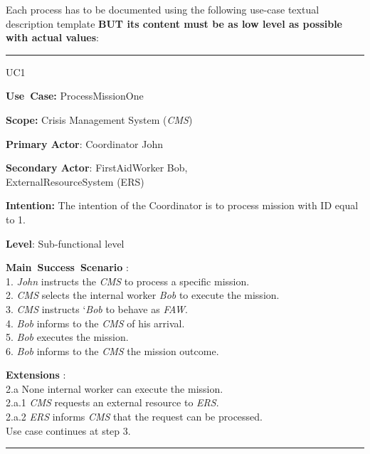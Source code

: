 Each process has to be documented using the following use-case textual description
template \cite{armour01usecase} \textbf{BUT its content must be as low level as possible with actual values}:
\vspace{0.5cm}
\hrule
\begin{lyxlist}{UC1}
\small{
\item [\textbf{Use~Case:}] ProcessMissionOne
\item [\textbf{Scope:}] Crisis Management System (\emph{CMS})
\item [\textbf{Primary Actor}:] Coordinator John
\item [\textbf{Secondary Actor}:] FirstAidWorker Bob,\\
                  ExternalResourceSystem (ERS)
\item [\textbf{Intention:}]The intention of the Coordinator is to process mission with ID equal to 1.
\item [\textbf{Level}:]Sub-functional level
\item [\textbf{Main~Success~Scenario}]:\\
1. \emph{John} instructs the \emph{CMS} to process a specific mission.\\
2. \emph{CMS} selects the internal worker \emph{Bob} to execute the mission.\\
3. \emph{CMS} instructs `\emph{Bob} to behave as \emph{FAW}.\\
4. \emph{Bob} informs to the \emph{CMS} of his arrival.\\
5. \emph{Bob} executes the mission.\\
6. \emph{Bob} informs to the \emph{CMS} the mission outcome.


\item [\textbf{Extensions}]:\\
2.a None internal worker can execute the mission.\\
\hspace*{0.5cm} 2.a.1 \emph{CMS} requests an external resource to \emph{ERS}.\\
\hspace*{0.5cm} 2.a.2 \emph{ERS} informs \emph{CMS} that the request can be processed.\\
\hspace*{1.4cm} Use case continues at step 3.

}

\end{lyxlist}
\hrule
\vspace{0.5cm}

